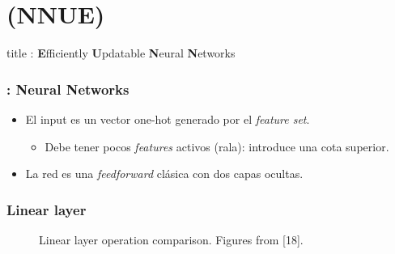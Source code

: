 
\section{ (NNUE)}

\begin{frame}
\vfill
\centering
\begin{beamercolorbox}[sep=8pt,center,shadow=false,rounded=false]{title}
    : \textbf{E}fficiently \textbf{U}pdatable \textbf{N}eural \textbf{N}etworks
    \par%
\end{beamercolorbox}
\vfill
\end{frame}



\begin{frame}
\frametitle{: \textbf{N}eural \textbf{N}etworks}
\begin{itemize}
\item El input es un vector one-hot generado por el \textit{feature set}.
\begin{itemize}
    \item Debe tener pocos \textit{features} activos (rala): introduce una cota superior.
\end{itemize}
\item La red es una \textit{feedforward} clásica con dos capas ocultas.
\end{itemize}
\end{frame}


\begin{frame}
\frametitle{Linear layer}
\begin{figure}[H]
\centering
{}%
\qquad
{}%
\caption{Linear layer operation comparison. Figures from [18].}
\label{fig:linear_comparison}
\end{figure}
\end{frame}

